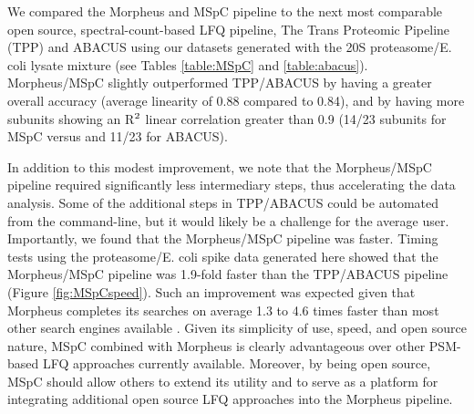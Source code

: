 We compared the Morpheus and MSpC pipeline to the next most comparable open source, spectral-count-based LFQ pipeline, The Trans Proteomic Pipeline (TPP) \citep{deutsch10} and ABACUS \citep{fermin11} using our datasets generated with the 20S proteasome/E. coli lysate mixture (see Tables \ref{table:MSpC} and \ref{table:abacus}).
Morpheus/MSpC slightly outperformed TPP/ABACUS by having a greater overall accuracy (average linearity of 0.88 compared to 0.84), and by having more subunits showing an R$\textsuperscript{2}$ linear correlation greater than 0.9 (14/23 subunits for MSpC versus and 11/23 for ABACUS).
\begin{table}[h]
	\centering
\begingroup
\let\clearpage\relax
\scalebox{0.7}{

}
\endgroup
\npnoround
\label{table:MSpC}
\end{table}
\begin{table}[h]
	\centering
\begingroup
\let\clearpage\relax
\scalebox{0.7}{

}
\endgroup
\npnoround
\label{table:abacus}
\end{table}

In addition to this modest improvement, we note that the Morpheus/MSpC pipeline required significantly less intermediary steps, thus accelerating the data analysis.
Some of the additional steps in TPP/ABACUS could be automated from the command-line, but it would likely be a challenge for the average user.
Importantly, we found that the Morpheus/MSpC pipeline was faster.
Timing tests using the proteasome/E. coli spike data generated here showed that the Morpheus/MSpC pipeline was 1.9-fold faster than the TPP/ABACUS pipeline (Figure \ref{fig:MSpCspeed}).
Such an improvement was expected given that Morpheus completes its searches on average 1.3 to 4.6 times faster than most other search engines available \citep{wenger13}. 
Given its simplicity of use, speed, and open source nature, MSpC combined with Morpheus is clearly advantageous over other PSM-based LFQ approaches currently available.  Moreover, by being open source, MSpC should allow others to extend its utility and to serve as a platform for integrating additional open source LFQ approaches into the Morpheus pipeline. 

